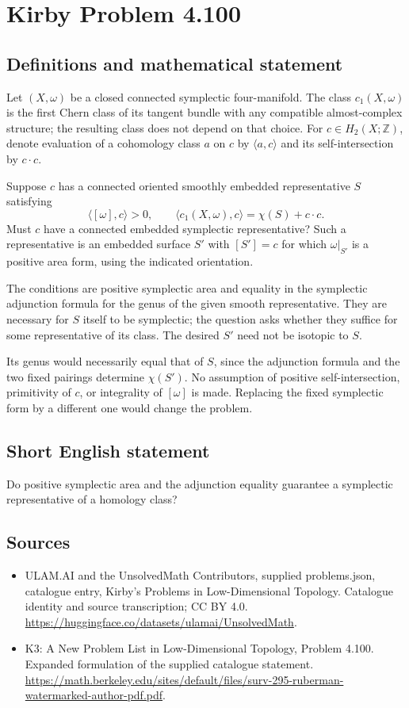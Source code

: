 \documentclass[11pt,a4paper]{article}
\begin{document}
\section*{Kirby Problem 4.100}\label{statement}

\subsection{Definitions and mathematical statement}
Let $(X,\omega)$ be a closed connected symplectic four-manifold. The class $c_1(X,\omega)$ is the first Chern class of its tangent bundle with any compatible almost-complex structure; the resulting class does not depend on that choice. For $c\in H_2(X;\mathbb Z)$, denote evaluation of a cohomology class $a$ on $c$ by $\langle a,c\rangle$ and its self-intersection by $c\cdot c$.

Suppose $c$ has a connected oriented smoothly embedded representative $S$ satisfying
\[
\langle[\omega],c\rangle>0,
\qquad
\langle c_1(X,\omega),c\rangle
=\chi(S)+c\cdot c.
\]
Must $c$ have a connected embedded symplectic representative? Such a representative is an embedded surface $S'$ with $[S']=c$ for which $\omega|_{S'}$ is a positive area form, using the indicated orientation.

The conditions are positive symplectic area and equality in the symplectic adjunction formula for the genus of the given smooth representative. They are necessary for $S$ itself to be symplectic; the question asks whether they suffice for some representative of its class. The desired $S'$ need not be isotopic to $S$.

Its genus would necessarily equal that of $S$, since the adjunction formula and the two fixed pairings determine $\chi(S')$. No assumption of positive self-intersection, primitivity of $c$, or integrality of $[\omega]$ is made. Replacing the fixed symplectic form by a different one would change the problem.
\subsection{Short English statement}
Do positive symplectic area and the adjunction equality guarantee a symplectic representative of a homology class?
\subsection{Sources}
\begin{itemize}
\item[S1] ULAM.AI and the UnsolvedMath Contributors, supplied problems.json, catalogue entry, Kirby's Problems in Low-Dimensional Topology. Catalogue identity and source transcription; CC BY 4.0.
\url{https://huggingface.co/datasets/ulamai/UnsolvedMath}.
\item[S2] K3: A New Problem List in Low-Dimensional Topology, Problem 4.100. Expanded formulation of the supplied catalogue statement.
\url{https://math.berkeley.edu/sites/default/files/surv-295-ruberman-watermarked-author-pdf.pdf}.
\end{itemize}
\end{document}
